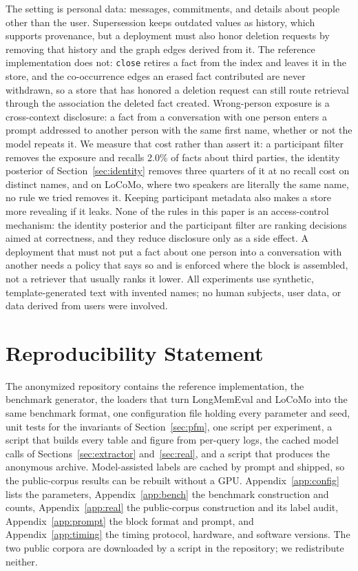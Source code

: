 \documentclass{article} %
\begin{document}
The setting is personal data: messages, commitments, and details about people other than the user. Supersession keeps outdated values as history, which supports provenance, but a deployment must also honor deletion requests by removing that history and the graph edges derived from it. The reference implementation does not: \texttt{close} retires a fact from the index and leaves it in the store, and the co-occurrence edges an erased fact contributed are never withdrawn, so a store that has honored a deletion request can still route retrieval through the association the deleted fact created. Wrong-person exposure is a cross-context disclosure: a fact from a conversation with one person enters a prompt addressed to another person with the same first name, whether or not the model repeats it. We measure that cost rather than assert it: a participant filter removes the exposure and recalls 2.0\% of facts about third parties, the identity posterior of Section~\ref{sec:identity} removes three quarters of it at no recall cost on distinct names, and on LoCoMo, where two speakers are literally the same name, no rule we tried removes it. Keeping participant metadata also makes a store more revealing if it leaks. None of the rules in this paper is an access-control mechanism: the identity posterior and the participant filter are ranking decisions aimed at correctness, and they reduce disclosure only as a side effect. A deployment that must not put a fact about one person into a conversation with another needs a policy that says so and is enforced where the block is assembled, not a retriever that usually ranks it lower. All experiments use synthetic, template-generated text with invented names; no human subjects, user data, or data derived from users were involved.

\section*{Reproducibility Statement}

The anonymized repository contains the reference implementation, the benchmark generator, the loaders that turn LongMemEval and LoCoMo into the same benchmark format, one configuration file holding every parameter and seed, unit tests for the invariants of Section~\ref{sec:pfm}, one script per experiment, a script that builds every table and figure from per-query logs, the cached model calls of Sections~\ref{sec:extractor} and~\ref{sec:real}, and a script that produces the anonymous archive. Model-assisted labels are cached by prompt and shipped, so the public-corpus results can be rebuilt without a GPU. Appendix~\ref{app:config} lists the parameters, Appendix~\ref{app:bench} the benchmark construction and counts, Appendix~\ref{app:real} the public-corpus construction and its label audit, Appendix~\ref{app:prompt} the block format and prompt, and Appendix~\ref{app:timing} the timing protocol, hardware, and software versions. The two public corpora are downloaded by a script in the repository; we redistribute neither.
\end{document}
